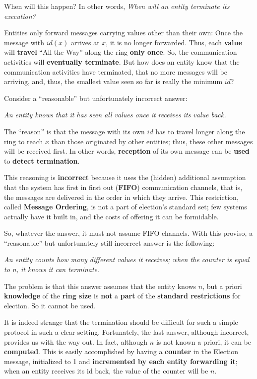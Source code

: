 When will this happen? In other words, \textit{When will an entity terminate its execution?} 

Entities only forward messages carrying values other than their own: Once the message with $id(x)$ arrives at $x$, it is no longer forwarded. Thus, each \textbf{value} will \textbf{travel} “All the Way” along the ring \textbf{only once}. So, the communication activities will \textbf{eventually terminate}. But how does an entity know that the communication activities have terminated, that no more messages will be arriving, and, thus, the smallest value seen so far is really the minimum $id$? 

Consider a “reasonable” but unfortunately incorrect answer:

\textit{An entity knows that it has seen all values once it receives its value back.}

The “reason” is that the message with its own $id$ has to travel longer along the ring to reach $x$ than those originated by other entities; thus, these other messages will be received first. In other words, \textbf{reception} of its own message can be \textbf{used} to \textbf{detect termination}. 

This reasoning is \textbf{incorrect} because it uses the (hidden) additional assumption that the system has first in first out (\textbf{FIFO}) communication channels, that is, the messages are delivered in the order in which they arrive. This restriction, called \textbf{Message Ordering}, is not a part of election’s standard set; few systems actually have it built in, and the costs of offering it can be formidable. 

So, whatever the answer, it must not assume FIFO channels. With this proviso, a “reasonable” but unfortunately still incorrect answer is the following: 

\textit{An entity counts how many different values it receives; when the counter is equal to n, it knows it can terminate}.

The problem is that this answer assumes that the entity knows $n$, but a priori \textbf{knowledge} of the \textbf{ring size} is \textbf{not} a \textbf{part} of the \textbf{standard restrictions} for election. So it cannot be used. 

It is indeed strange that the termination should be difficult for such a simple protocol in such a clear setting. Fortunately, the last answer, although incorrect, provides us with the way out. In fact, although $n$ is not known a priori, it can be \textbf{computed}. This is easily accomplished by having a \textbf{counter} in the Election message, initialized to 1 and \textbf{incremented by each entity forwarding it}; when an entity receives its id back, the value of the counter will be $n$. 

